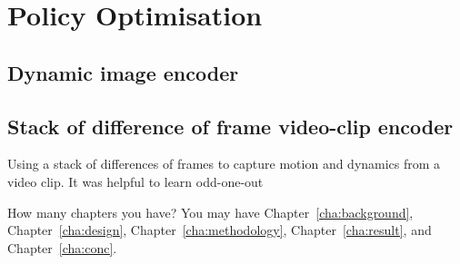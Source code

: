 \chapter{Policy Optimisation}
\label{cha:intro}

\section{Dynamic image encoder}


\section{Stack of difference of frame video-clip encoder}
Using a stack of differences of frames to capture motion and dynamics from a video clip. It was helpful to learn odd-one-out

How many chapters you have? You may have Chapter~\ref{cha:background},
Chapter~\ref{cha:design}, Chapter~\ref{cha:methodology},
Chapter~\ref{cha:result}, and Chapter~\ref{cha:conc}.
